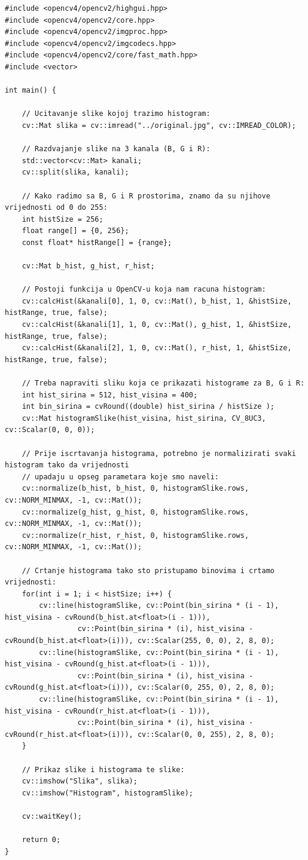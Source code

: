 \documentclass[a4paper, 12pt]{article}
\begin{document}
\begin{lstlisting}
#include <opencv4/opencv2/highgui.hpp>
#include <opencv4/opencv2/core.hpp>
#include <opencv4/opencv2/imgproc.hpp>
#include <opencv4/opencv2/imgcodecs.hpp>
#include <opencv4/opencv2/core/fast_math.hpp>
#include <vector>

int main() {

    // Ucitavanje slike kojoj trazimo histogram:
    cv::Mat slika = cv::imread("../original.jpg", cv::IMREAD_COLOR);

    // Razdvajanje slike na 3 kanala (B, G i R):
    std::vector<cv::Mat> kanali;
    cv::split(slika, kanali);

    // Kako radimo sa B, G i R prostorima, znamo da su njihove vrijednosti od 0 do 255:
    int histSize = 256;
    float range[] = {0, 256};
    const float* histRange[] = {range};

    cv::Mat b_hist, g_hist, r_hist;

    // Postoji funkcija u OpenCV-u koja nam racuna histogram:
    cv::calcHist(&kanali[0], 1, 0, cv::Mat(), b_hist, 1, &histSize, histRange, true, false);
    cv::calcHist(&kanali[1], 1, 0, cv::Mat(), g_hist, 1, &histSize, histRange, true, false);
    cv::calcHist(&kanali[2], 1, 0, cv::Mat(), r_hist, 1, &histSize, histRange, true, false);

    // Treba napraviti sliku koja ce prikazati histograme za B, G i R:
    int hist_sirina = 512, hist_visina = 400;
    int bin_sirina = cvRound((double) hist_sirina / histSize );
    cv::Mat histogramSlike(hist_visina, hist_sirina, CV_8UC3, cv::Scalar(0, 0, 0));

    // Prije iscrtavanja histograma, potrebno je normalizirati svaki histogram tako da vrijednosti
    // upadaju u opseg parametara koje smo naveli:
    cv::normalize(b_hist, b_hist, 0, histogramSlike.rows, cv::NORM_MINMAX, -1, cv::Mat());
    cv::normalize(g_hist, g_hist, 0, histogramSlike.rows, cv::NORM_MINMAX, -1, cv::Mat());
    cv::normalize(r_hist, r_hist, 0, histogramSlike.rows, cv::NORM_MINMAX, -1, cv::Mat());

    // Crtanje histograma tako sto pristupamo binovima i crtamo vrijednosti:
    for(int i = 1; i < histSize; i++) {
        cv::line(histogramSlike, cv::Point(bin_sirina * (i - 1), hist_visina - cvRound(b_hist.at<float>(i - 1))),
                 cv::Point(bin_sirina * (i), hist_visina - cvRound(b_hist.at<float>(i))), cv::Scalar(255, 0, 0), 2, 8, 0);
        cv::line(histogramSlike, cv::Point(bin_sirina * (i - 1), hist_visina - cvRound(g_hist.at<float>(i - 1))),
                 cv::Point(bin_sirina * (i), hist_visina - cvRound(g_hist.at<float>(i))), cv::Scalar(0, 255, 0), 2, 8, 0);
        cv::line(histogramSlike, cv::Point(bin_sirina * (i - 1), hist_visina - cvRound(r_hist.at<float>(i - 1))),
                 cv::Point(bin_sirina * (i), hist_visina - cvRound(r_hist.at<float>(i))), cv::Scalar(0, 0, 255), 2, 8, 0);
    }

    // Prikaz slike i histograma te slike:
    cv::imshow("Slika", slika);
    cv::imshow("Histogram", histogramSlike);

    cv::waitKey();

    return 0;
}
\end{lstlisting}
\end{document}
